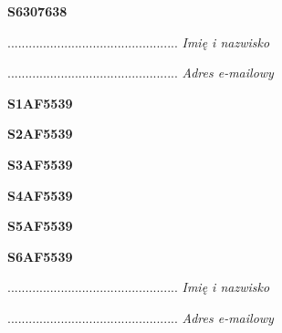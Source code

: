 \begin{turn}{90}\huge \textbf{S6307638}\end{turn}

\begin{turn}{90}\begin{minipage}{\linewidth} \vspace{20mm} ................................................  \textit{Imię i nazwisko}\end{minipage}\end{turn}

\begin{turn}{90}\begin{minipage}{\linewidth} \vspace{20mm} ................................................  \textit{Adres e-mailowy}\end{minipage}\end{turn}

\begin{turn}{90}\huge \textbf{S1AF5539}\end{turn}

\begin{turn}{90}\huge \textbf{S2AF5539}\end{turn}

\begin{turn}{90}\huge \textbf{S3AF5539}\end{turn}

\begin{turn}{90}\huge \textbf{S4AF5539}\end{turn}

\begin{turn}{90}\huge \textbf{S5AF5539}\end{turn}

\begin{turn}{90}\huge \textbf{S6AF5539}\end{turn}

\begin{turn}{90}\begin{minipage}{\linewidth} \vspace{20mm} ................................................  \textit{Imię i nazwisko}\end{minipage}\end{turn}

\begin{turn}{90}\begin{minipage}{\linewidth} \vspace{20mm} ................................................  \textit{Adres e-mailowy}\end{minipage}\end{turn}

